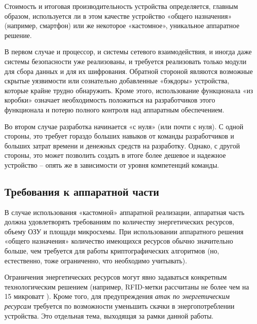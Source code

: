 Стоимость и итоговая производительность устройства определяется, главным образом, используется ли в этом качестве устройство «общего назначения» (например, смартфон) или же некоторое «кастомное», уникальное аппаратное решение.

В первом случае и процессор, и системы сетевого взаимодействия, и иногда даже системы безопасности уже реализованы, и требуется реализовать только модули для сбора данных и для их шифрования. Обратной стороной являются возможные скрытые уязвимости или сознательно добавленные «бэкдоры» устройства, которые крайне трудно обнаружить. Кроме этого, использование функционала «из коробки» означает необходимость положиться на разработчиков этого функционала и потерю полного контроля над аппаратным обеспечением.

Во втором случае разработка начинается «с нуля» (или почти с нуля). С одной стороны, это требует гораздо больших навыков от команды разработчиков и больших затрат времени и денежных средств на разработку. Однако, с другой стороны, это может позволить создать в итоге более дешевое и надежное устройство – опять же в зависимости от уровня компетенций команды.

\subsection{Требования к аппаратной части} %

В случае использования «кастомной» аппаратной реализации, аппаратная часть должна удовлетворять требованиям по количеству энергетических ресурсов, объему ОЗУ и площади микросхемы. При использовании аппаратного решения «общего назначения» количество имеющихся ресурсов обычно значительно больше, чем требуется для работы криптографических алгоритмов (но, естественно, тоже ограниченно, что необходимо учитывать).

Ограничения энергетических ресурсов могут явно задаваться конкретным технологическим решением (например, RFID-метки рассчитаны не более чем на 15 микроватт \cite{src24}). Кроме того, для предупреждения \textit{атак по энергетическим ресурсам} требуется по возможности уменьшить скачки в энергопотреблении устройства. Это отдельная тема, выходящая за рамки данной работы.

